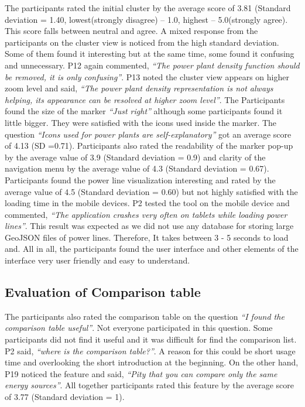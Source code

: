 The participants rated the initial cluster by the average score of 3.81 (Standard deviation = 1.40, lowest(strongly disagree) – 1.0, highest – 5.0(strongly agree). This score falls between neutral and agree. A mixed response from the participants on the cluster view is noticed from the high standard deviation. Some of them found it interesting but at the same time, some found it confusing and unnecessary. P12 again commented, \textit{“The power plant density function should be removed, it is only confusing”}. P13 noted the cluster view appears on higher zoom level and said, \textit{“The power plant density representation is not always helping, its appearance can be resolved at higher zoom level”}. The Participants found the size of the marker \textit{“Just right”} although some participants found it little bigger. They were satisfied with the icons used inside the marker. The question \textit{“Icons used for power plants are self-explanatory”} got an average score of 4.13 (SD =0.71). Participants also rated the readability of the marker pop-up by the average value of 3.9 (Standard deviation = 0.9) and clarity of the navigation menu by the average value of 4.3 (Standard deviation = 0.67). Participants found the power line visualization interesting and rated by the average value of 4.5 (Standard deviation = 0.60) but not highly satisfied with the loading time in the mobile devices. P2 tested the tool on the mobile device and commented, \textit{“The application crashes very often on tablets while loading power lines”}. This result was expected as we did not use any database for storing large GeoJSON files of power lines. Therefore, It takes between 3 - 5 seconds to load and. All in all, the participants found the user interface and other elements of the interface very user friendly and easy to understand.

\subsection*{Evaluation of Comparison table}

The participants also rated the comparison table on the question \textit{“I found the comparison table useful”}. Not everyone participated in this question. Some participants did not find it useful and it was difficult for find the comparison list.  P2 said, \textit{“where is the comparison table?”}. A reason for this could be short usage time and overlooking the short introduction at the beginning. On the other hand, P19 noticed the feature and said, \textit{“Pity that you can compare only the same energy sources”}. All together participants rated this feature by the average score of 3.77 (Standard deviation = 1).

